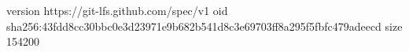version https://git-lfs.github.com/spec/v1
oid sha256:43fdd8cc30bbc0e3d23971e9b682b541d8c3e69703ff8a295f5fbfc479adeecd
size 154200
